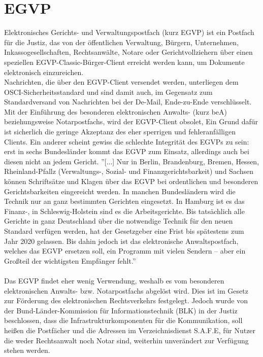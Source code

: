 \section{EGVP}
Elektronisches Gerichts- und Verwaltungspostfach (kurz EGVP) ist ein Postfach für die Justiz, das von der öffentlichen Verwaltung, Bürgern, Unternehmen, Inkassogesellschaften, Rechtsanwälte, Notare oder Gerichtvollziehern über einen speziellen EGVP-Classic-Bürger-Client erreicht werden kann, um Dokumente elektronisch einzureichen. \\
Nachrichten, die über den EGVP-Client versendet werden, unterliegen dem OSCI-Sicherheitsstandard und sind damit auch, im Gegensatz zum Standardversand von Nachrichten bei der De-Mail, Ende-zu-Ende verschlüsselt. Mit der Einführung des besonderen elektronischen Anwalts- (kurz beA) beziehungsweise Notarpostfachs, wird der EGVP-Client obsolet, Ein Grund dafür ist sicherlich die geringe Akzeptanz des eher sperrigen und fehleranfälligen Clients. Ein anderer scheint gewiss die schlechte Integrität des EGVPs zu sein: erst in sechs Bundesländer kommt das EGVP zum Einsatz, allerdings auch bei diesen nicht an jedem Gericht. ''[...] Nur in Berlin, Brandenburg, Bremen, Hessen, Rheinland-Pfallz (Verwaltungs-, Sozial- und Finanzgerichtsbarkeit) und Sachsen können Schriftsätze und Klagen über das EGVP bei ordentlichen und besonderen Gerichtsbarkeiten eingereicht werden.
In manchen Bundesländern wird die Technik nur an ganz bestimmten Gerichten eingesetzt. In Hamburg ist es das Finanz-, in Schleswig-Holstein sind es die Arbeitsgerichte. Bis tatsächlich alle Gerichte in ganz Deutschland über die notwendige Technik für den neuen Standard verfügen werden, hat der Gesetzgeber eine Frist bis spätestens zum Jahr 2020 gelassen. Bis dahin jedoch ist das elektronische Anwaltspostfach, welches das EGVP ersetzen soll, ein Programm mit vielen Sendern – aber ein Großteil der wichtigsten Empfänger fehlt.'' \textcite{bea:egvp:landkarte} \\
\\
Das EGVP findet eher wenig Verwendung, weshalb es vom besonderen elektronischen Anwalts- bzw. Notarpostfachs abgelöst wird. Dies ist im Gesetz zur Förderung des elektronischen Rechtsverkehrs festgelegt. Jedoch wurde von der Bund-Länder-Kommission für Informationstechnik (BLK) in der Justiz beschlossen, dass die Infrastrukturkomponenten für die Kommunikation, soll heißen die Postfächer und die Adressen im Verzeichnisdienst S.A.F.E, für Nutzer die weder Rechtsanwalt noch Notar sind, weiterhin unverändert zur Verfügung stehen werden. \textcite{bea:egvp} \\

